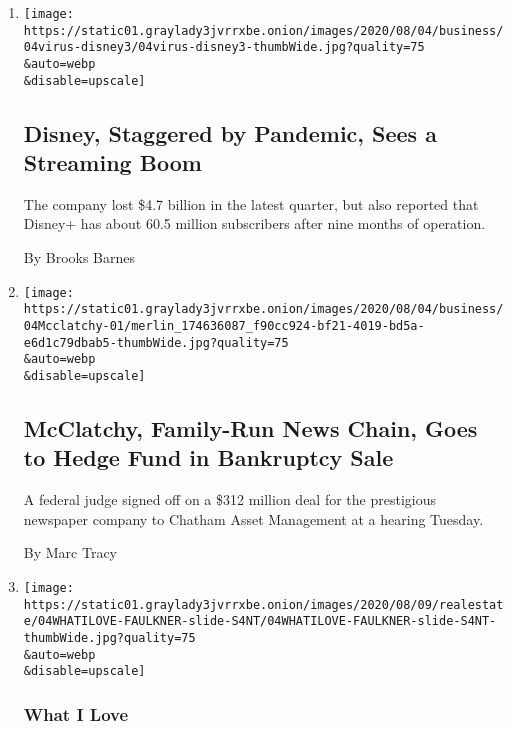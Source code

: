 \begin{enumerate}
\def\labelenumi{\arabic{enumi}.}
\item
  \href{/2020/08/04/business/media/disney-earnings-coronavirus.html}{}

  \texttt{[image: https://static01.graylady3jvrrxbe.onion/images/2020/08/04/business/04virus-disney3/04virus-disney3-thumbWide.jpg?quality=75\\\&auto=webp\\\&disable=upscale]}

  \hypertarget{disney-staggered-by-pandemic-sees-a-streaming-boom}{%
  \subsection{Disney, Staggered by Pandemic, Sees a Streaming
  Boom}\label{disney-staggered-by-pandemic-sees-a-streaming-boom}}

  The company lost \$4.7 billion in the latest quarter, but also
  reported that Disney+ has about 60.5 million subscribers after nine
  months of operation.

  By Brooks Barnes
\item
  \href{/2020/08/04/business/media/mcclatchy-newspapers-bankrutpcy-chatham.html}{}

  \texttt{[image: https://static01.graylady3jvrrxbe.onion/images/2020/08/04/business/04Mcclatchy-01/merlin\_174636087\_f90cc924-bf21-4019-bd5a-e6d1c79dbab5-thumbWide.jpg?quality=75\\\&auto=webp\\\&disable=upscale]}

  \hypertarget{mcclatchy-family-run-news-chain-goes-to-hedge-fund-in-bankruptcy-sale}{%
  \subsection{McClatchy, Family-Run News Chain, Goes to Hedge Fund in
  Bankruptcy
  Sale}\label{mcclatchy-family-run-news-chain-goes-to-hedge-fund-in-bankruptcy-sale}}

  A federal judge signed off on a \$312 million deal for the prestigious
  newspaper company to Chatham Asset Management at a hearing Tuesday.

  By Marc Tracy
\item
  \href{/2020/08/04/realestate/harris-faulkner-home-fox-news.html}{}

  \texttt{[image: https://static01.graylady3jvrrxbe.onion/images/2020/08/09/realestate/04WHATILOVE-FAULKNER-slide-S4NT/04WHATILOVE-FAULKNER-slide-S4NT-thumbWide.jpg?quality=75\\\&auto=webp\\\&disable=upscale]}

  \hypertarget{what-i-love}{%
  \subsubsection{What I Love}\label{what-i-love}}


\end{enumerate}
